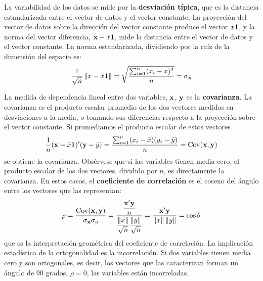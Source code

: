 La variabilidad de los datos se mide por la \textbf{desviación típica}, que es la distancia estandarizada entre el vector de datos y el vector constante. La proyección del vector de datos sobre la dirección del vector constante produce el vector $\bar{x}\mathbf{1}$, y la norma del vector diferencia, $\mathbf{x}-\bar{x}\mathbf{1}$, mide la distancia entre el vector de datos y el vector constante. La norma estandarizada, dividiendo por la raíz de la dimensión del espacio es:
$$\frac{1}{\sqrt{n}}\left\| x-\bar{x}\mathbf{1}\right\|=\sqrt{\frac{\sum_{i=1}^n(x_i-\bar{x})^2}{n}}=\sigma_{\mathbf{x}}$$

La medida de dependencia lineal entre dos variables, $\mathbf{x}$, $\mathbf{y}$ es la \textbf{covarianza}. La covarianza es el producto escalar promedio de los dos vectores medidos en desviaciones a la media, o tomando sus diferencias respecto a la proyección sobre el vector constante. Si promediamos el producto escalar de estos vectores
$$\frac{1}{n}(\mathbf{x}-\bar{x}\mathbf{1})'(\mathbf{y}-\bar{y})=\frac{\sum_{i=1}^n(x_i-\bar{x})(y_i-\bar{y})}{n}=\operatorname{Cov}(\mathbf{x},\mathbf{y})$$
se obtiene la covarianza. Obsérvese que si las variables tienen media cero, el producto escalar de los dos vectores, dividido por $n$, es directamente la covarianza. En estos casos, el \textbf{coeficiente de correlación} es el coseno del ángulo entre los vectores que las representan:
$$\rho=\frac{\operatorname{Cov}(\mathbf{x},\mathbf{y})}{\sigma_{\mathbf{x}}\sigma_y}=\frac{\dfrac{\mathbf{x}'\mathbf{y}}{n}}{\dfrac{\left\| x\right\|}{\sqrt{n}}\dfrac{\left\| y\right\|}{\sqrt{n}}}=\frac{\mathbf{x}'\mathbf{y}}{\left\| x\right\|\left\| y\right\|}=\cos\theta$$
que es la interpretación geométrica del coeficiente de correlación. La implicación estadística de la ortogonalidad es la incorrelación. Si dos variables tienen media cero y son ortogonales, es decir, los vectores que las caracterizan forman un ángulo de 90 grados, $\rho =0$, las variables están incorreladas.



